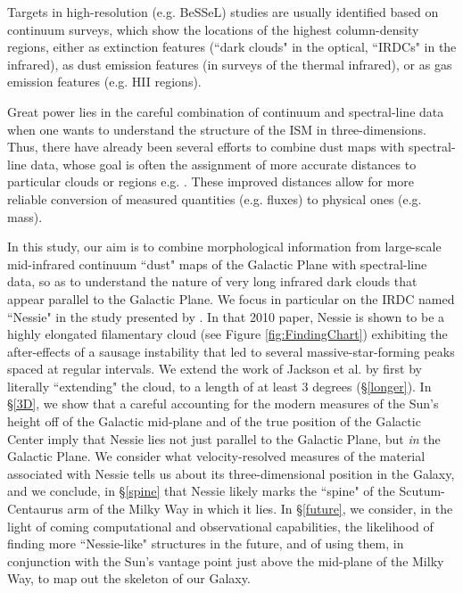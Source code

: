 Targets in high-resolution (e.g. BeSSeL) studies are usually identified based on continuum surveys, which show the locations of the highest column-density regions, either as extinction features (``dark clouds" in the optical, ``IRDCs" in the infrared), as dust emission features (in surveys of the thermal infrared), or as gas emission features (e.g. HII regions).

Great power lies in the careful combination of continuum and spectral-line data when one wants to understand the structure of the ISM in three-dimensions. Thus, there have already been several efforts to combine dust maps with spectral-line data, whose goal is often the assignment of more accurate distances to particular clouds or regions e.g. \citep{Foster2012}.  These improved distances allow for more reliable conversion of  measured quantities (e.g. fluxes) to physical ones (e.g. mass).

In this study, our aim is to combine morphological information from large-scale mid-infrared continuum ``dust" maps of the Galactic Plane with spectral-line data, so as to understand the nature of very long infrared dark clouds that appear parallel to the Galactic Plane. We focus in particular on the IRDC named ``Nessie" in the study presented by \citet{Jackson2010}.  In that 2010 paper, Nessie is shown to be a highly elongated filamentary cloud (see Figure \ref{fig:FindingChart})  exhibiting the after-effects of a sausage instability that led to several massive-star-forming peaks spaced at regular intervals.
We extend the work of Jackson et al. by first by literally ``extending" the cloud, to a length of at least 3 degrees (\S \ref{longer}). In \S \ref{3D}, we show that a careful accounting for the modern measures of
the Sun's height off of the Galactic mid-plane and of the true position of the Galactic Center imply that Nessie lies not
just parallel to the Galactic Plane, but \emph{in} the Galactic Plane. We consider what velocity-resolved measures of the
material associated with Nessie tells us about its three-dimensional position in the Galaxy, and we conclude, in \S \ref{spine} that Nessie likely marks the ``spine" of the Scutum-Centaurus arm of the Milky Way in which it lies. In \S \ref{future}, we consider, in the light of coming computational and observational capabilities, the likelihood of finding more ``Nessie-like" structures in the future, and of using them, in conjunction with the Sun's vantage point just above the mid-plane of the Milky Way, to map out the skeleton of our Galaxy.
